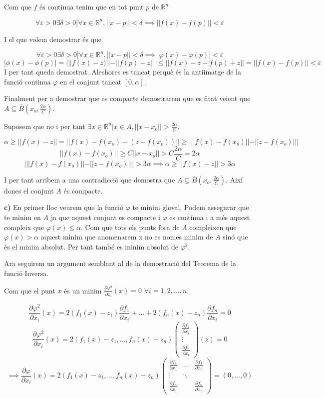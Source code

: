 \documentclass[12pt, a4papre]{article}
\begin{document}
	Com que $f$ és continua tenim que en tot punt $p$ de $\mathbb{R}^n$
	
	\[
	\forall \varepsilon > 0 \exists \delta >0| \forall x\in \mathbb{R}^n, ||x-p|| < \delta \implies ||f(x) - f(p)|| < \varepsilon
	\]
	
	I el que volem demostrar és que
	
	\[
	\forall \varepsilon > 0 \exists \delta >0| \forall x\in \mathbb{R}^n, ||x-p|| < \delta \implies |\varphi(x) - \varphi(p)| < \varepsilon
	\]
	\[
	|\phi(x) - \phi(p)| = |||f(x)-z)|| - ||f(p)-z||| \leq ||f(x)-z-f(p)+z||=||f(x)-f(p)|| < \varepsilon
	\]
	I per tant queda demostrat. Aleshores es tancat perquè és la antiimatge de la funció continua $\varphi$ en el conjunt tancat $[0,\alpha]$.
	
	Finalment per a demostrar que es compacte demostrarem que es fitat veient que $A\subseteq \bar{B}(x_o,\frac{2\alpha}{C})$. 
	
	Suposem que no i per tant $\exists x\in \mathbb{R}^n | x\in A, ||x-x_o|| > \frac{2\alpha}{C}$.
	
	\[
	\alpha \geq ||f(x)-z|| = ||f(x)-f(x_o)-(z-f(x_o))|| \geq |||f(x)-f(x_o)||-||z-f(x_o)|||
	\]
	\[
	||f(x)-f(x_o)|| \geq C||x-x_o|| > C\frac{2\alpha}{C}=2\alpha
	\]
	\[
	|||f(x)-f(x_o)||-||z-f(x_o)||| > 3\alpha \implies \alpha \geq ||f(x)-z||> 3\alpha
	\]
	
	I per tant arribem a una contradicció que demostra que $A\subseteq \bar{B}(x_o,\frac{2\alpha}{C})$. Així doncs el conjunt $A$ és compacte.
	
	\textbf{c)} En primer lloc veurem que la funció $\varphi$ te minim gloval. Podem assegurar que te minim en $A$ ja que aquest conjunt es compacte i 
	$\varphi$ es contínua i a més aquest compleix que $\varphi(x) \leq \alpha$. Com que tots els punts fora de $A$ compleixen que $\varphi(x) > \alpha$ aquest 
	minim que anomenarem x no es nomes minim de $A$ sinó que és el minim absolut. Per tant també es minim absolut de $\varphi^2$.
	
	Ara seguirem un argument semblant al de la demostració del Teorema de la funció Inversa. 
	
	Com que el punt $x$ és un minim $\frac{\partial \varphi^2}{\partial x_i} (x)=0$ $ \forall i=1,2,...,n$.
	
	\[
	\frac{\partial \varphi^2}{\partial x_i} (x)=2(f_1(x)-z_1)\frac{\partial f_1}{\partial x_i} +\hdots+2(f_n(x)-z_n)\frac{\partial f_n}{\partial x_i}=0
	\]
	\[
	\frac{\partial \varphi^2}{\partial x_i} (x)=2(f_1(x)-z_1, \hdots, f_n(x)-z_n)
	\begin{pmatrix}
	\frac{\partial f_1}{\partial x_i}\\
	\vdots\\
	\frac{\partial f_n}{\partial x_i}
	\end{pmatrix}
	(z)=0
	\]
	\[
	\implies \frac{\partial \varphi}{\partial x_i} (x)=2(f_1(x)-z_1, \hdots, f_n(x)-z_n)
	\begin{pmatrix}
	\frac{\partial f_1}{\partial x_1}	&	\hdots	&\frac{\partial f_1}{\partial x_n}\\
	\vdots	&	\ddots\\
	\frac{\partial f_n}{\partial x_1}	&			&\frac{\partial f_n}{\partial x_n}
	\end{pmatrix}
	=
	(0,\hdots,0)
	\]
	
\end{document}
